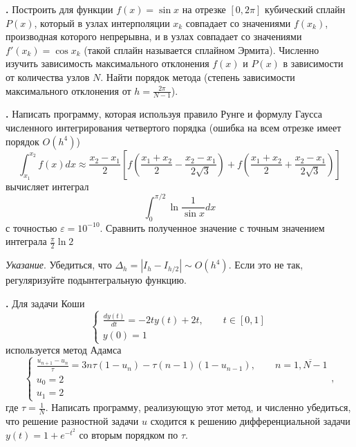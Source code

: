 \documentclass[12pt]{article}
\newcounter{task}
\newcommand{\problem}{\par\textbf{\stepcounter{task}\thetask. }}
\begin{document}
\problem Построить для функции $f(x) = \sin x$ на отрезке $[0, 2\pi]$ кубический
сплайн $P(x)$, который в узлах интерполяции $x_k$ совпадает со значениями $f(x_k)$,
производная которого непрерывна, и в узлах совпадает со значениями $f'(x_k) =
\cos x_k$ (такой сплайн называется сплайном Эрмита). Численно изучить зависимость
максимального отклонения $f(x)$ и $P(x)$ в зависимости от количества узлов $N$.
Найти порядок метода (степень зависимости максимального отклонения от
$h = \frac{2\pi}{N - 1}$).

\problem Написать программу, которая используя правило Рунге и формулу
Гаусса численного интегрирования четвертого порядка (ошибка на всем
отрезке имеет порядок $O(h^4)$)
\[
\int_{x_1}^{x_2} f(x) dx \approx \frac{x_2 - x_1}{2}\left[
f\left(\frac{x_1+x_2}{2} - \frac{x_2 - x_1}{2\sqrt{3}}\right) +
f\left(\frac{x_1+x_2}{2} + \frac{x_2 - x_1}{2\sqrt{3}}\right)
\right]
\]
вычисляет интеграл
\[
\int_0^{\pi/2} \ln \frac{1}{\sin x} dx
\]
с точностью $\varepsilon = 10^{-10}$. Сравнить полученное значение с точным
значением интеграла $\frac{\pi}{2} \ln 2$

\emph{Указание}. Убедиться, что $\Delta_h = |I_h - I_{h/2}| \sim O(h^4)$. Если это
не так, регуляризуйте подынтегральную функцию.


\problem Для задачи Коши
\[
\begin{cases}
\displaystyle\frac{dy(t)}{dt} = -2t y(t) + 2 t, \qquad t \in [0,1]\\
y(0) = 1
\end{cases}
\]
используется метод Адамса
\[
\begin{cases}
\displaystyle\frac{u_{n+1} - u_{n}}{\tau} = 3 n \tau(1 - u_n) - \tau  (n-1)(1 - u_{n-1}), \qquad n =
\overline{1, N-1}\\
u_0 = 2\\
u_1 = 2
\end{cases},
\]
где $\tau = \frac{1}{N}$.
Написать программу, реализующую этот метод, и численно убедиться, что решение
разностной задачи $u$ сходится к решению дифференциальной задачи $y(t) = 1 + e^{-t^2}$ со вторым порядком
по $\tau$.
\end{document}
